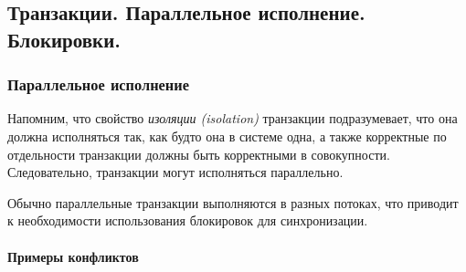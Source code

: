 \subsection{Транзакции. Параллельное исполнение. Блокировки.}

\subsubsection{Параллельное исполнение}

Напомним, что свойство \textit{изоляции (isolation)} транзакции подразумевает, что она должна
исполняться так, как будто она в системе одна, а также корректные по отдельности транзакции должны
быть корректными в совокупности. Следовательно, транзакции могут исполняться параллельно.

Обычно параллельные транзакции выполняются в разных потоках, что приводит к необходимости
использования блокировок для синхронизации.

\paragraph{Примеры конфликтов}

